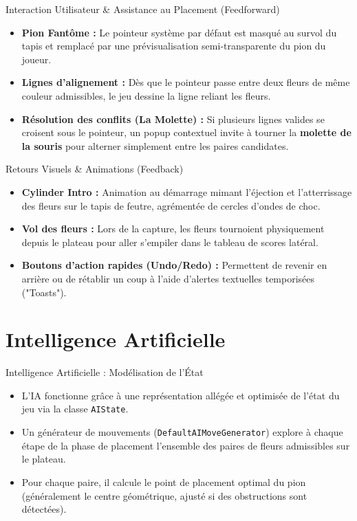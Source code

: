 \documentclass{beamer}
\begin{document}
\begin{frame}{Interaction Utilisateur \& Assistance au Placement (Feedforward)}
    \begin{itemize}
        \item \textbf{Pion Fantôme :} Le pointeur système par défaut est masqué au survol du tapis et remplacé par une prévisualisation semi-transparente du pion du joueur.
        \item \textbf{Lignes d'alignement :} Dès que le pointeur passe entre deux fleurs de même couleur admissibles, le jeu dessine la ligne reliant les fleurs.
        \item \textbf{Résolution des conflits (La Molette) :} Si plusieurs lignes valides se croisent sous le pointeur, un popup contextuel invite à tourner la \textbf{molette de la souris} pour alterner simplement entre les paires candidates.
    \end{itemize}
\end{frame}

\begin{frame}{Retours Visuels \& Animations (Feedback)}
    \begin{itemize}
        \item \textbf{Cylinder Intro :} Animation au démarrage mimant l'éjection et l'atterrissage des fleurs sur le tapis de feutre, agrémentée de cercles d'ondes de choc.
        \item \textbf{Vol des fleurs :} Lors de la capture, les fleurs tournoient physiquement depuis le plateau pour aller s'empiler dans le tableau de scores latéral.
        \item \textbf{Boutons d'action rapides (Undo/Redo) :} Permettent de revenir en arrière ou de rétablir un coup à l'aide d'alertes textuelles temporisées ("Toasts").
    \end{itemize}
\end{frame}

\section{Intelligence Artificielle}

\begin{frame}{Intelligence Artificielle : Modélisation de l'État}
    \begin{itemize}
        \item L'IA fonctionne grâce à une représentation allégée et optimisée de l'état du jeu via la classe \texttt{AIState}.
        \item Un générateur de mouvements (\texttt{DefaultAIMoveGenerator}) explore à chaque étape de la phase de placement l'ensemble des paires de fleurs admissibles sur le plateau.
        \item Pour chaque paire, il calcule le point de placement optimal du pion (généralement le centre géométrique, ajusté si des obstructions sont détectées).
    \end{itemize}
\end{frame}
\end{document}
